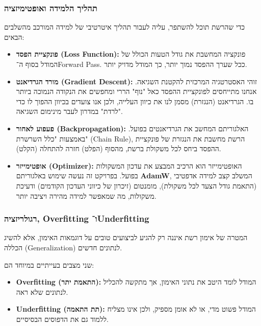 \subsubsection{תהליך הלמידה ואופטימיזציה}

כדי שהרשת תוכל להשתפר, עליה לעבור תהליך איטרטיבי של למידה המורכב
מהשלבים הבאים:
\begin{itemize}
\item \textbf{פונקציית הפסד (\textenglish{Loss Function}):} פונקציה
  המחשבת את גודל הטעות הכולל של המודל בסוף ה־\textenglish{Forward
    Pass}. ככל שערך ההפסד נמוך יותר, כך המודל מדויק יותר.
\item \textbf{מורד הגרדיאנט (\textenglish{Gradient Descent}):} זוהי
  האסטרטגיה המרכזית להקטנת השגיאה. אנחנו מתייחסים לפונקציית ההפסד כאל
  "נוף" הררי ומחפשים את הנקודה הנמוכה ביותר בו. הגרדיאנט (הנגזרת) מסמן
  לנו את כיוון העלייה, ולכן אנו צועדים בכיוון ההפוך לו כדי "לרדת"
  במדרון לעבר מינימום השגיאה.
\item \textbf{פעפוע לאחור (\textenglish{Backpropagation}):} האלגוריתם
  המחשב את הגרדיאנטים בפועל. באמצעות "כלל השרשרת" (\textenglish{Chain
    Rule}), הרשת מחשבת את הנגזרת של פונקציית ההפסד ביחס לכל משקולת
  ברשת, מהסוף (הפלט) חזרה להתחלה (הקלט).
\item \textbf{אופטימייזר (\textenglish{Optimizer}):} האופטימייזר הוא
  הרכיב המבצע את עדכון המשקולות בפועל. בפרויקט זה נעשה שימוש באלגוריתם
  \textbf{\textenglish{AdamW}}, המשלב קצב למידה אדפטיבי (התאמת גודל
  הצעד לכל משקולת), מומנטום (זיכרון של כיווני העדכון הקודמים) ודעיכת
  משקולות, מה שמאפשר למידה מהירה ויציבה יותר.
\end{itemize}

\subsubsection{רגולריזציה, \textenglish{Overfitting}
ו־\textenglish{Underfitting}}

המטרה של אימון רשת איננה רק להגיע לביצועים טובים על דוגמאות האימון,
אלא להשיג הכללה (\textenglish{Generalization}) לנתונים חדשים.

שני מצבים בעייתיים במיוחד הם:
\begin{itemize}
\item \textbf{\textenglish{Overfitting} (התאמת יתר):} המודל לומד היטב
את נתוני האימון, אך מתקשה להכליל לנתונים שלא ראה.
\item \textbf{\textenglish{Underfitting} (תת התאמה):} המודל פשוט מדי,
או לא אומן מספיק, ולכן אינו מצליח ללמוד גם את הדפוסים הבסיסיים.
\end{itemize}

